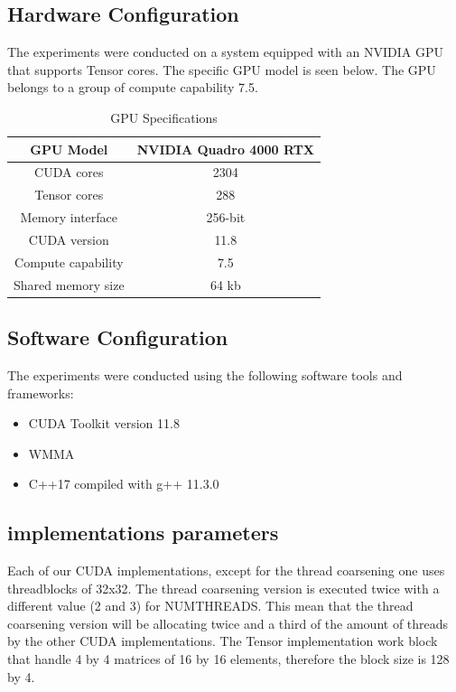 \documentclass[conference]{IEEEtran}
\begin{document}
  \subsection{Hardware Configuration}\label{sec:hardware-configuration}
  
  The experiments were conducted on a system equipped with an NVIDIA GPU that supports Tensor cores.
  The specific GPU model is seen below. The GPU belongs to a group of compute capability 7.5. 
  
  \begin{table}[htbp]
  \caption{GPU Specifications\cite{Voltatuningguide}}
  \centering
    \begin{tabular}{|c|c|}
    \hline
    GPU Model & NVIDIA Quadro 4000 RTX \\
    \hline
    CUDA cores & 2304 \\
    \hline
    Tensor cores & 288 \\
    \hline
    Memory interface & 256-bit \\
    \hline
    CUDA version & 11.8 \\
    \hline
    Compute capability & 7.5 \\
    \hline
    Shared memory size & 64 kb \\
    \hline
    
  \end{tabular}
  \end{table}
  
  \subsection{Software Configuration}\label{sec:software-configuration}
  
  The experiments were conducted using the following software tools and frameworks:
  
  \begin{itemize}
    \item CUDA Toolkit version 11.8
    \item WMMA
    \item C++17 compiled with g++ 11.3.0
  \end{itemize}
  \subsection{implementations parameters}
  Each of our CUDA implementations, except for the thread coarsening one uses threadblocks of 32x32.
  The thread coarsening version is executed twice with a different value (2 and 3) for NUMTHREADS. This
  mean that the thread coarsening version will be allocating twice and a third of the amount of threads
  by the other CUDA implementations. The Tensor implementation work block that handle 4 by 4 matrices of
  16 by 16 elements, therefore the block size is 128 by 4.
\end{document}
